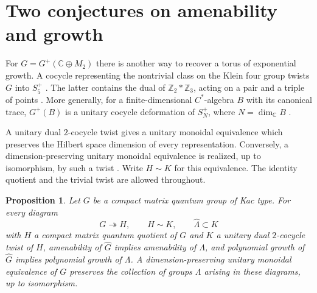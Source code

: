 \documentclass[11pt,a4paper]{article}
\newtheorem{prop}[thm]{Proposition}
\theoremstyle{remark}
\begin{document}
\section{Two conjectures on amenability and growth}\label{secanalytic}

For $G=G^+(\mathbb C\oplus M_2)$ there is another way
to recover a torus of exponential growth. A cocycle representing the nontrivial
class on the Klein four group twists $G$ into $S_5^+$ \cite[Theorem~4.8]{mrozinski}.
The latter contains the dual of $\mathbb Z_2*\mathbb Z_3$, acting on a pair
and a triple of points \cite{bbd}. More generally, for a finite-dimensional
$C^*$-algebra $B$ with its canonical trace, $G^+(B)$ is a
unitary cocycle deformation of $S_N^+$, where $N=\dim_{\mathbb C}B$
\cite[Theorem~3.1]{behy}.

A unitary dual $2$-cocycle twist gives a unitary monoidal equivalence
which preserves the Hilbert space dimension of every representation. Conversely, a dimension-preserving unitary
monoidal equivalence is realized, up to isomorphism, by such a twist
\cite{bdv}. Write $H\sim K$ for this equivalence. The identity quotient and the trivial twist are allowed throughout.

\begin{prop}\label{twistnecessary}
Let $G$ be a compact matrix quantum group of Kac type. For every diagram
\[
 G\twoheadrightarrow H,\qquad H\sim K,\qquad \widehat\Lambda\subset K
\]
with $H$ a compact matrix quantum quotient of $G$ and $K$ a unitary dual
$2$-cocycle twist of $H$, amenability of $\widehat G$ implies amenability
of $\Lambda$, and polynomial growth of $\widehat G$ implies polynomial
growth of $\Lambda$. A dimension-preserving unitary monoidal
equivalence of $G$ preserves the collection of groups $\Lambda$ arising
in these diagrams, up to isomorphism.
\end{prop}
\end{document}
